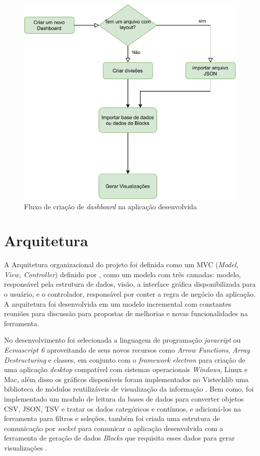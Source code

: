 \documentclass[
	12pt,				%
	openright,			%
	oneside,			%
	a4paper,			%
	english,			%
	brazil				%
	]{abntex2}
\begin{document}
\begin{figure}
	\caption{\label{fig_fluxo}Fluxo de criação de \textit{ dashboard} na aplicação desenvolvida}
	\begin{center}
	    \includegraphics[scale=1]{figures/Diagrama de fluxo tcc.pdf}
	\end{center}
\end{figure}

\section{Arquitetura}
A Arquitetura organizacional do projeto foi definida como um MVC (\textit{Model, View, Controller}) definido por \cite{deacon2009model}, como um modelo com três camadas: modelo, responsável pela estrutura de dados, visão, a interface gráfica disponibilizada para o usuário, e o controlador, responsável por conter a regra de negócio da aplicação. A arquitetura foi desenvolvida em um modelo incremental com constantes reuniões para discussão para propostas de melhorias e novas funcionalidades na ferramenta. 

No desenvolvimento foi selecionada a linguagem de programação \textit{javacript} ou \textit{Ecmascript 6} aproveitando de seus novos recursos como \textit{Arrow Functions}, \textit{Array Destructuring} e classes, em conjunto com o \textit{framework} \textit{electron} \cite{electron} para criação de uma aplicação \textit{desktop} compatível com sistemas operacionais \textit{Windows}, Linux e Mac, além disso os gráficos disponíveis foram implementados no Vistechlib uma biblioteca de módulos reutilizáveis de visualização da informação \cite{Vistechlib}. Bem como, foi implementado um modulo de leitura da bases de dados para converter objetos CSV, JSON, TSV e tratar os dados categóricos e contínuos, e adicioná-los na ferramenta para filtros e seleções, também foi criada uma estrutura de comunicação por \textit{socket} para comunicar a aplicação desenvolvida com a ferramenta de geração de dados \textit{Blocks} \cite{blocks} que requisita esses dados para gerar visualizações .
\end{document}

